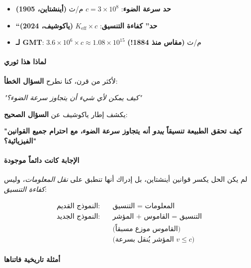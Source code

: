 \documentclass[11pt,a4paper]{article}
\begin{document}
	\begin{itemize}
		\item \textbf{حد سرعة الضوء}: $c = 3 \times 10^8$ م/ث \textbf{(أينشتاين، 1905)}
		\item \textbf{``حد'' كفاءة التنسيق}: $K_{\mathrm{eff}} \times c$ \textbf{(ياكوشيف، 2024)}
		\item \textbf{لـ GMT}: $3.6 \times 10^6 \times c \approx 1.08 \times 10^{15}$ م/ث \textbf{(مقاس منذ 1884!)}
	\end{itemize}
	
	\paragraph{لماذا هذا ثوري}
	لأكثر من قرن، كنا نطرح \textbf{السؤال الخطأ}:
	\begin{center}
		\itshape "كيف يمكن لأي شيء أن يتجاوز سرعة الضوء؟" 
	\end{center}
	
	يكشف إطار ياكوشيف عن \textbf{السؤال الصحيح}:
	\begin{center}
		\bfseries "كيف تحقق الطبيعة تنسيقاً \emph{يبدو} أنه يتجاوز سرعة الضوء، مع احترام جميع القوانين الفيزيائية؟"
	\end{center}
	
	\paragraph{الإجابة كانت دائماً موجودة}
	لم يكن الحل يكسر قوانين أينشتاين، بل إدراك أنها تنطبق على \emph{نقل المعلومات}، وليس \emph{كفاءة التنسيق}:
	
	\begin{align*}
		\textbf{النموذج القديم:} & \quad \text{المعلومات = التنسيق} \\
		\textbf{النموذج الجديد:} & \quad \text{التنسيق = القاموس + المؤشر} \\
		& \quad \text{(القاموس موزع مسبقاً)} \\
		& \quad \text{(المؤشر يُنقل بسرعة $v \leq c$)}
	\end{align*}
	
	\paragraph{أمثلة تاريخية فاتناها}
	
\end{document}
